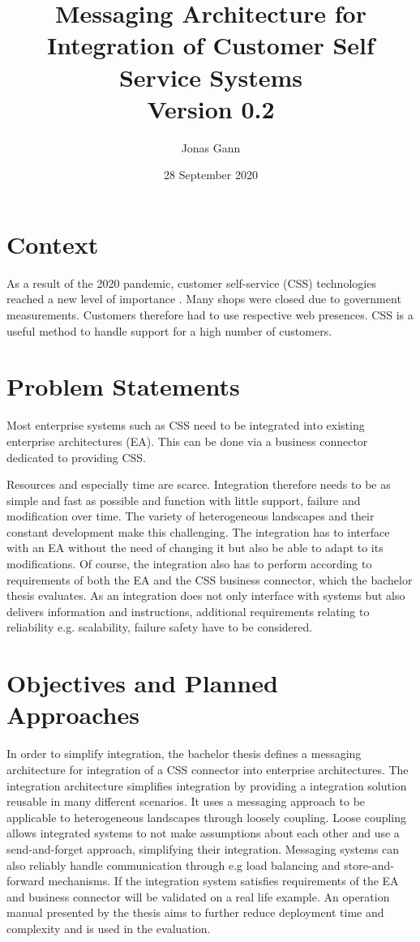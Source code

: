 \documentclass{article}
\title{Messaging Architecture for Integration of Customer Self Service Systems \\ Version 0.2}
\author{Jonas Gann}
\date{28 September 2020}
\begin{document}
\maketitle

\section{Context}
As a result of the 2020 pandemic, customer self-service (CSS) technologies reached a new level of importance \cite{covid}.
Many shops were closed due to government measurements. Customers therefore had to use respective web
presences. CSS is a useful method to handle support for a high number of customers.

\section{Problem Statements}

Most enterprise systems such as CSS need to be integrated into existing enterprise architectures (EA).
This can be done via a business connector dedicated to providing CSS. 

Resources and especially time are scarce. Integration therefore needs to be as simple and fast as possible and 
function with little support, failure and modification over time. The variety of heterogeneous landscapes and their constant 
development make this challenging. The integration has to interface with an EA without the need of changing it but also be able to 
adapt to its modifications.
Of course, the integration also has to perform according to requirements of both the EA and the CSS business connector, which 
the bachelor thesis evaluates.
As an integration does not only interface with systems but also delivers information and instructions, additional requirements 
relating to reliability e.g. scalability, failure safety have to be considered.

\section{Objectives and Planned Approaches}

In order to simplify integration, the bachelor thesis defines a messaging architecture for integration of a CSS connector 
into enterprise
architectures. The integration architecture simplifies integration by providing a integration solution reusable in many different 
scenarios. It uses a messaging approach to be applicable to heterogeneous landscapes through loosely coupling. 
Loose coupling allows integrated systems to not make assumptions about each other and use a send-and-forget approach, 
simplifying their integration.
Messaging systems can also reliably handle communication through e.g load balancing and store-and-forward mechanisms.
If the integration system satisfies requirements of the EA and business connector will be validated on a real life example.
An operation manual presented by the thesis aims to further reduce deployment time and complexity and is used in the evaluation.
\end{document}
